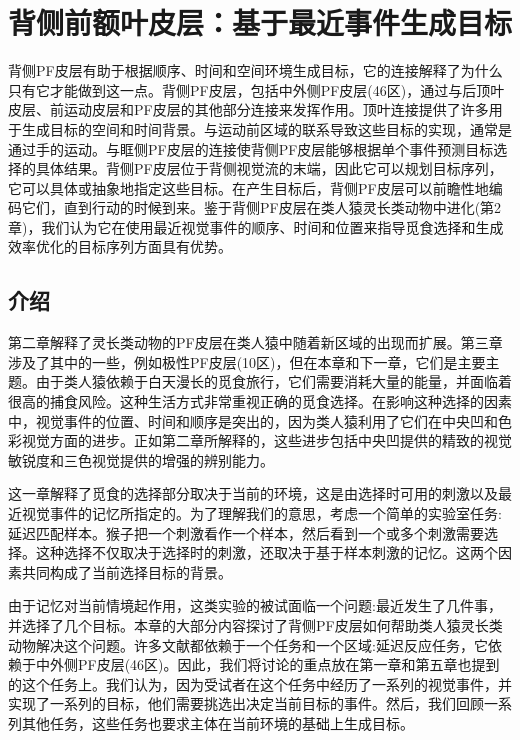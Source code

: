 \chapter{背侧前额叶皮层：基于最近事件生成目标} \label{chap:chap6}
背侧PF皮层有助于根据顺序、时间和空间环境生成目标，它的连接解释了为什么只有它才能做到这一点。背侧PF皮层，包括中外侧PF皮层(46区)，通过与后顶叶皮层、前运动皮层和PF皮层的其他部分连接来发挥作用。顶叶连接提供了许多用于生成目标的空间和时间背景。与运动前区域的联系导致这些目标的实现，通常是通过手的运动。与眶侧PF皮层的连接使背侧PF皮层能够根据单个事件预测目标选择的具体结果。背侧PF皮层位于背侧视觉流的末端，因此它可以规划目标序列，它可以具体或抽象地指定这些目标。在产生目标后，背侧PF皮层可以前瞻性地编码它们，直到行动的时候到来。鉴于背侧PF皮层在类人猿灵长类动物中进化(第2章)，我们认为它在使用最近视觉事件的顺序、时间和位置来指导觅食选择和生成效率优化的目标序列方面具有优势。

\section{介绍}
第二章解释了灵长类动物的PF皮层在类人猿中随着新区域的出现而扩展。第三章涉及了其中的一些，例如极性PF皮层(10区)，但在本章和下一章，它们是主要主题。由于类人猿依赖于白天漫长的觅食旅行，它们需要消耗大量的能量，并面临着很高的捕食风险。这种生活方式非常重视正确的觅食选择。在影响这种选择的因素中，视觉事件的位置、时间和顺序是突出的，因为类人猿利用了它们在中央凹和色彩视觉方面的进步。正如第二章所解释的，这些进步包括中央凹提供的精致的视觉敏锐度和三色视觉提供的增强的辨别能力。

这一章解释了觅食的选择部分取决于当前的环境，这是由选择时可用的刺激以及最近视觉事件的记忆所指定的。为了理解我们的意思，考虑一个简单的实验室任务:延迟匹配样本。猴子把一个刺激看作一个样本，然后看到一个或多个刺激需要选择。这种选择不仅取决于选择时的刺激，还取决于基于样本刺激的记忆。这两个因素共同构成了当前选择目标的背景。

由于记忆对当前情境起作用，这类实验的被试面临一个问题:最近发生了几件事，并选择了几个目标。本章的大部分内容探讨了背侧PF皮层如何帮助类人猿灵长类动物解决这个问题。许多文献都依赖于一个任务和一个区域:延迟反应任务，它依赖于中外侧PF皮层(46区)。因此，我们将讨论的重点放在第一章和第五章也提到的这个任务上。我们认为，因为受试者在这个任务中经历了一系列的视觉事件，并实现了一系列的目标，他们需要挑选出决定当前目标的事件。然后，我们回顾一系列其他任务，这些任务也要求主体在当前环境的基础上生成目标。
